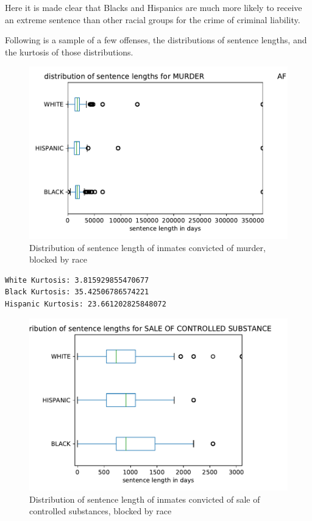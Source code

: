 \documentclass[11pt]{article}
\begin{document}
    Here it is made clear that Blacks and Hispanics are much more likely to
receive an extreme sentence than other racial groups for the crime of
criminal liability.

Following is a sample of a few offenses, the distributions of sentence
lengths, and the kurtosis of those distributions.

\begin{figure}[H]
    \centering
    \includegraphics[scale=.6]{images/MURDEr_box.pdf}
    \caption{Distribution of sentence length of inmates convicted of murder, blocked by race}
    \label{fig:my_label}
\end{figure}
    
    \begin{Verbatim}[commandchars=\\\{\}]
White Kurtosis: 3.815929855470677
Black Kurtosis: 35.42506786574221
Hispanic Kurtosis: 23.661202825848072

    \end{Verbatim}

\begin{figure}[H]
    \centering
    \includegraphics[scale=.6]{images/SALE OF CO_box.pdf}
    \caption{Distribution of sentence length of inmates convicted of sale of controlled substances, blocked by race}
    \label{fig:my_label}
\end{figure}
    
\end{document}
